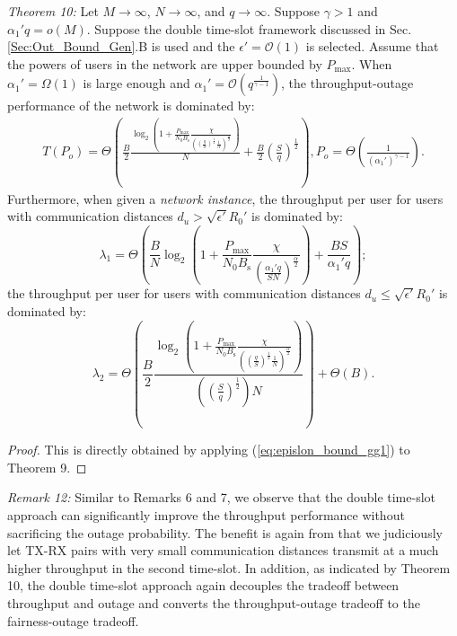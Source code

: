 \documentclass[journal,draftclsnofoot,onecolumn,12pt,twoside]{IEEEtran}
\begin{document}
{\em Theorem 10:} Let $M\to\infty$, $N\to\infty$, and $q\to\infty$. Suppose $\gamma>1$ and $\alpha_1'q=o(M)$. Suppose the double time-slot framework discussed in Sec. \ref{Sec:Out_Bound_Gen}.B is used and the $\epsilon'=\mathcal{O}(1)$ is selected. Assume that the powers of users in the network are upper bounded by $P_{\text{max}}$. When $\alpha_1'=\Omega(1)$ is large enough and $\alpha_1'=\mathcal{O}\left(q^{\frac{1}{\gamma-1}}\right)$, the throughput-outage performance of the network is dominated by:
\begin{equation}
\begin{aligned}
T(P_o)=\Theta\left(\frac{B}{2}\frac{\log_2\left(1+\frac{P_{\text{max}}}{N_0B_{\text{s}}}\frac{\chi}{\left(\left(\frac{q}{S}\right)^{\frac{1}{2}}\frac{1}{N}\right)^\frac{\alpha}{2}}\right)}{N}+\frac{B}{2}\left(\frac{S}{q}\right)^{\frac{1}{2}}\right),P_o=\Theta\left(\frac{1}{(\alpha_1')^{\gamma-1}}\right).
\end{aligned}
\end{equation}
Furthermore, when given a {\em network instance}, the throughput per user for users with communication distances $d_u> \sqrt{\epsilon'}R_0'$ is dominated by:
\begin{equation}
\lambda_1=\Theta\left(\frac{B}{N}\log_2\left(1+\frac{P_{\text{max}}}{N_0B_{\text{s}}}\frac{\chi}{\left(\frac{\alpha_1'q}{SN}\right)^\frac{\alpha}{2}}\right)+\frac{BS}{\alpha_1'q}\right);
\end{equation}
the throughput per user for users with communication distances $d_u\leq\sqrt{\epsilon'}R_0'$ is dominated by:
\begin{equation}
\lambda_2=\Theta\left(\frac{B}{2}\frac{\log_2\left(1+\frac{P_{\text{max}}}{N_0B_{\text{s}}}\frac{\chi}{\left(\left(\frac{q}{S}\right)^{\frac{1}{2}}\frac{1}{N}\right)^\frac{\alpha}{2}}\right)}{\left(\left(\frac{S}{q}\right)^{\frac{1}{2}}\right)N}\right)+\Theta(B).
\end{equation}
\begin{proof}
This is directly obtained by applying (\ref{eq:epislon_bound_gg1}) to Theorem 9.
\end{proof}

{\em Remark 12:} Similar to Remarks 6 and 7, we observe that the double time-slot approach can significantly improve the throughput performance without sacrificing the outage probability. The benefit is again from that we judiciously let TX-RX pairs with very small communication distances transmit at a much higher throughput in the second time-slot. In addition, as indicated by Theorem 10, the double time-slot approach again decouples the tradeoff between throughput and outage and converts the throughput-outage tradeoff to the fairness-outage tradeoff.
\end{document}

